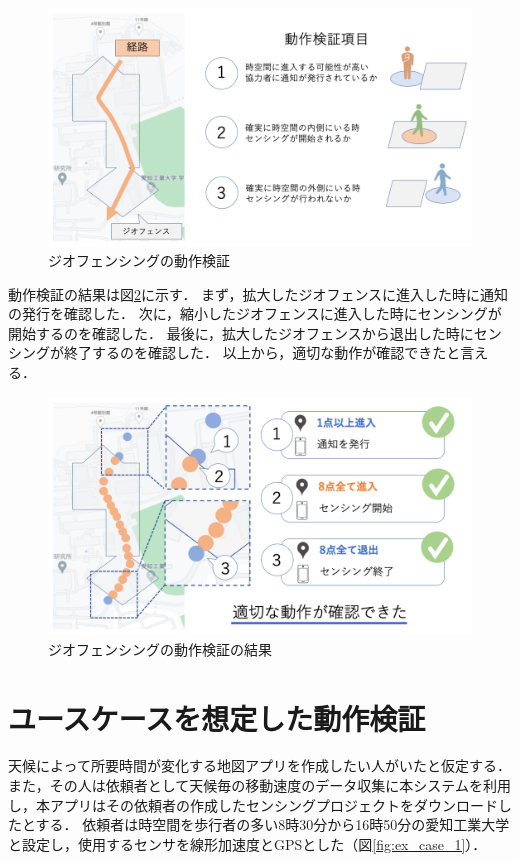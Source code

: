 \begin{figure}[tbh]
    \centering
    \includegraphics[width=16cm]{img_ex_margin_1.png}
    \caption{ジオフェンシングの動作検証}
    \label{fig:ex_margin_1}
\end{figure}

動作検証の結果は図\ref{fig:ex_margin_2}に示す．
まず，拡大したジオフェンスに進入した時に通知の発行を確認した．
次に，縮小したジオフェンスに進入した時にセンシングが開始するのを確認した．
最後に，拡大したジオフェンスから退出した時にセンシングが終了するのを確認した．
以上から，適切な動作が確認できたと言える．

\begin{figure}[tbh]
    \centering
    \includegraphics[width=16cm]{img_ex_margin_2.png}
    \caption{ジオフェンシングの動作検証の結果}
    \label{fig:ex_margin_2}
\end{figure}

\section{ユースケースを想定した動作検証}
天候によって所要時間が変化する地図アプリを作成したい人がいたと仮定する．
また，その人は依頼者として天候毎の移動速度のデータ収集に本システムを利用し，本アプリはその依頼者の作成したセンシングプロジェクトをダウンロードしたとする．
依頼者は時空間を歩行者の多い8時30分から16時50分の愛知工業大学と設定し，使用するセンサを線形加速度とGPSとした（図\ref{fig:ex_case_1}）．

